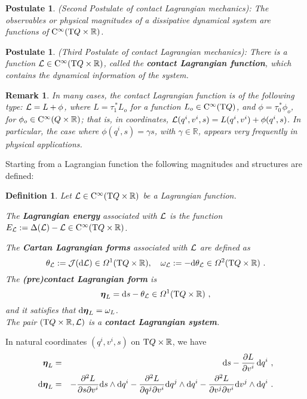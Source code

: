\documentclass[12pt]{report}
\newtheorem{definition}[teor]{Definition}
\newtheorem{remark}[teor]{Remark}
\newtheorem{pos}[teor]{Postulate}
\def\beann{\begin{eqnarray*}}
\def\eeann{\end{eqnarray*}}
\def\df{{\mit\Omega}}
\def\Lag{{\cal L}}
\def\d{{\rm d}}
\def\Real{\mathbb{R}}
\def\bmeta{\mbox{\boldmath $\eta$}}
\def\Tan{{\rm T}}
\def\Cinfty{{\rm C}^\infty}
\begin{document}
\begin{pos}
{\rm (Second Postulate of contact Lagrangian mechanics\/)}:
The observables or physical magnitudes of a 
dissipative dynamical system are functions of $\Cinfty(\Tan Q\times\Real)$.
\end{pos}

\begin{pos}
{\rm (Third Postulate of contact Lagrangian mechanics\/)}:
There is a function $\Lag\in\Cinfty (\Tan Q\times\Real)$, 
called the {\sl \textbf{contact Lagrangian function}},
which contains the dynamical information of the system.
\end{pos}

\begin{remark}{\rm
In many cases, the contact Lagrangian function is of the following type:
$\Lag=L+\phi$, 
where $L=\tau_1^{\,*}L_o$ for a function
$L_o\in\Cinfty(\Tan Q)$, and $\phi=\tau_0^{\,*}\phi_o$, for $\phi_o\in\Cinfty(Q\times\Real)$;
that is, in coordinates, $\Lag(q^i,v^i,s)=L(q^i,v^i)+\phi(q^i,s)$.
In particular, the case where $\phi(q^i,s)=\gamma s$, with $\gamma\in\Real$,
appears very frequently in physical applications.   
}\end{remark}

Starting from a Lagrangian function the following magnitudes and structures are defined:

\begin{definition}
\label{definition:lagrangian-function}
Let $\Lag\in\Cinfty(\Tan Q\times\Real)$ be a Lagrangian function.

\noindent The {\sl\textbf{Lagrangian energy}}
associated with $\Lag$ is the function $E_\Lag:= \Delta(\Lag)-\Lag\in\Cinfty(\Tan Q\times\Real)$. 

\noindent The {\sl\textbf{Cartan Lagrangian forms}}
associated with $\Lag$ are defined as
\begin{equation}
\label{eq:thetaL}
\theta_\Lag:={\cal J}(\d\Lag)\in\df^1(\Tan Q\times\Real) 
,\quad
\omega_\Lag:=-\d\theta_\Lag\in\df^2(\Tan Q\times\Real)  \ .
\end{equation}
The {\sl\textbf{(pre)contact Lagrangian form}} is
$$
\bmeta_L=\d s-\theta_\Lag\in\df^1(\Tan Q\times\Real)
\ ,
$$
and it satisfies that $\d\bmeta_L=\omega_L$.
\\
The pair $(\Tan Q\times\Real,\Lag)$ is a {\sl\textbf{contact Lagrangian system}}.
\end{definition}

In natural coordinates $(q^i, v^i, s)$ on $\Tan Q\times\Real$, we have
\beann
\bmeta_L&=&\d s-\frac{\partial L}{\partial v^i} \,\d q^i \ ,
\\ %
\d\bmeta_L&=& 
-\frac{\partial^2L}{\partial s\partial v^i}\d s\wedge\d q^i 
-\frac{\partial^2L}{\partial q^j\partial v^i}\d q^j\wedge\d q^i 
-\frac{\partial^2L}{\partial v^j\partial v^i}\d v^j\wedge\d q^i\ .
\eeann
\end{document}
